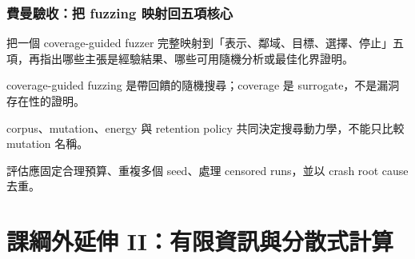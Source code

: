 \documentclass[11pt,a4paper,oneside,openany]{book}
\begin{document}
\section{費曼驗收：把 fuzzing 映射回五項核心}
\begin{feynmancheck}
把一個 coverage-guided fuzzer 完整映射到「表示、鄰域、目標、選擇、停止」五項，再指出哪些主張是經驗結果、哪些可用隨機分析或最佳化界證明。
\end{feynmancheck}
\begin{chapterrecap}
\item coverage-guided fuzzing 是帶回饋的隨機搜尋；coverage 是 surrogate，不是漏洞存在性的證明。
\item corpus、mutation、energy 與 retention policy 共同決定搜尋動力學，不能只比較 mutation 名稱。
\item 評估應固定合理預算、重複多個 seed、處理 censored runs，並以 crash root cause 去重。
\end{chapterrecap}

\part{課綱外延伸 II：有限資訊與分散式計算}
\end{document}
